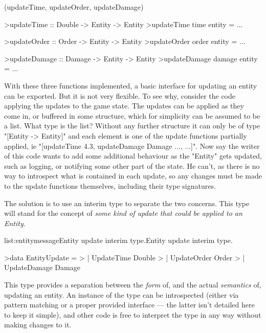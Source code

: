 \functions(updateTime, updateOrder, updateDamage)
\begin{haskell}

>updateTime :: Double -> Entity -> Entity
>updateTime time entity = ...

>updateOrder :: Order -> Entity -> Entity
>updateOrder order entity = ... 

>updateDamage :: Damage -> Entity -> Entity
>updateDamage damage entity = ...

\end{haskell}
\noindent With these three functions implemented, a basic interface for updating an entity can be exported. But it is not very flexible. To see why, consider the code applying the updates to the game state. The updates can be applied as they come in, or buffered in some structure, which for simplicity can be assumed to be a list. What type is the list? Without any further structure it can only be of type "[Entity -> Entity]" and each element is one of the update functions partially applied, ie "[updateTime 4.3, updateDamage Damage {...}, ...]". Now say the writer of this code wants to add some additional behaviour as the "Entity" gets updated, such as logging, or notifying some other part of the state. He can't, as there is no way to introspect what is contained in each update, so any changes must be made to the update functions themselves, including their type signatures.

The solution is to use an interim type to separate the two concerns. This type will stand for the concept of \emph{some kind of update that could be applied to an Entity}.

\vspace{-0.5em}
\begin{listing}{list:entitymessage}{Entity update interim type.}{Entity update interim type.}{}
\end{listing}\vspace{-1.5em}

\begin{haskell}

>data EntityUpdate = 
>  | UpdateTime Double
>  | UpdateOrder Order
>  | UpdateDamage Damage

\end{haskell}
\noindent This type provides a separation between the \emph{form} of, and the actual \emph{semantics} of, updating an entity. An instance of the type can be introspected (either via pattern matching or a proper provided interface --- the latter isn't detailed here to keep it simple), and other code is free to interpret the type in any way without making changes to it.

